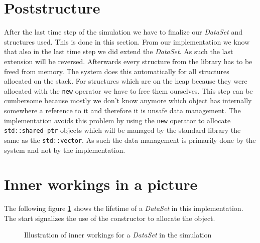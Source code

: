 \section{Poststructure}
After the last time step of the simulation we have to finalize our \textit{DataSet} and structures used. This is done in this section. From our implementation we know that also in the last time step we did extend the \textit{DataSet}. As such the last extension will be reversed. Afterwards every structure from the library has to be freed from memory. The system does this automatically for all structures allocated on the stack. For structures which are on the heap because they were allocated with the \texttt{new} operator we have to free them ourselves. This step can be cumbersome because mostly we don't know anymore which object has internally somewhere a reference to it and therefore it is unsafe data management. The implementation avoids this problem by using the \texttt{new} operator to allocate \texttt{std::shared\_ptr} objects which will be managed by the standard library the same as the \texttt{std::vector}. As such the data management is primarily done by the system and not by the implementation.
\section{Inner workings in a picture}
The following figure \ref{fig:illustration} shows the lifetime of a \textit{DataSet} in this implementation. The start signalizes the use of the constructor to allocate the object.
\begin{figure}[ht!]
\caption{Illustration of inner workings for a \textit{DataSet} in the simulation}
\label{fig:illustration}
\end{figure}

